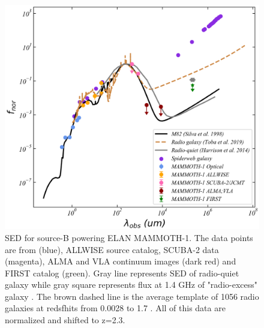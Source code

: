 \documentclass[../Results.tex]{subfiles}
\begin{document}
	\begin{figure}[htp]
		\centering
		\includegraphics[width=\columnwidth]{figs/SED_fitting}
		\caption{SED for source-B powering ELAN MAMMOTH-1. The data points are from \citet{cai2017discovery} (blue), ALLWISE source catalog, SCUBA-2 data \citep{arrigoni2018overdensity} (magenta), ALMA and VLA continuum images \citep{emonts2019cold} (dark red) and FIRST catalog (green). Gray line represents SED of radio-quiet galaxy while gray square represents flux at 1.4 GHz of "radio-excess" galaxy \citet{harrison2014kiloparsec}. The brown dashed line is the average template of 1056 radio galaxies at redsfhits from 0.0028 to 1.7 \citep{Toba_2019}. All of this data are normalized and shifted to z=2.3.}
		\label{SED}
	\end{figure}
	
\end{document}
